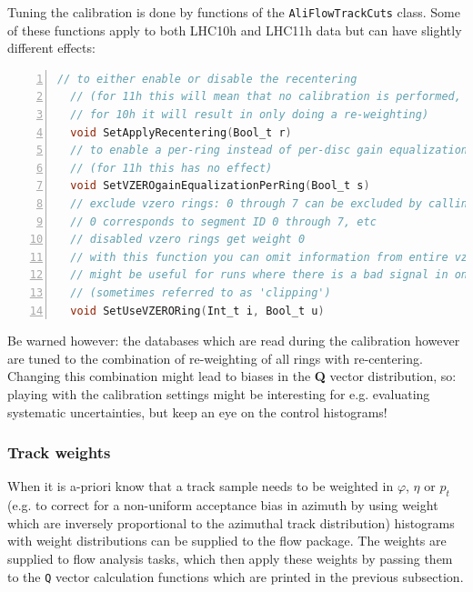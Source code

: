 \documentclass[a4paper]{book}
\numberwithin{equation}{subsection}
\begin{document}
\begin{description}
Tuning the calibration is done by functions of the \texttt{AliFlowTrackCuts} class. Some of these functions apply to both LHC10h and LHC11h data but can have slightly different effects:
\begin{lstlisting}[language=C, numbers=left]
  // to either enable or disable the recentering 
  // (for 11h this will mean that no calibration is performed,
  // for 10h it will result in only doing a re-weighting)
  void SetApplyRecentering(Bool_t r)
  // to enable a per-ring instead of per-disc gain equalization (=re-weighting)
  // (for 11h this has no effect)
  void SetVZEROgainEqualizationPerRing(Bool_t s)   
  // exclude vzero rings: 0 through 7 can be excluded by calling this setter multiple times
  // 0 corresponds to segment ID 0 through 7, etc
  // disabled vzero rings get weight 0
  // with this function you can omit information from entire vzero rings
  // might be useful for runs where there is a bad signal in one of the tiles
  // (sometimes referred to as 'clipping')
  void SetUseVZERORing(Int_t i, Bool_t u)\end{lstlisting}
Be warned however: the databases which are read during the calibration however are tuned to the combination of re-weighting of all rings with re-centering. Changing this combination might lead to biases in the \textbf{Q} vector distribution, so: playing with the calibration settings might be interesting for e.g. evaluating systematic uncertainties, but keep an eye on the control histograms!
\end{description}

\subsubsection{Track weights}\label{sec:weights}
When it is a-priori know that a track sample needs to be weighted in $\varphi$, $\eta$ or $p_t$ (e.g. to correct for a non-uniform acceptance bias in azimuth by using weight which are inversely proportional to the azimuthal track distribution) histograms with weight distributions can be supplied to the flow package. The weights are supplied to flow analysis tasks, which then apply these weights by passing them to the \texttt{Q} vector calculation functions which are printed in the previous subsection. 
\end{document}
